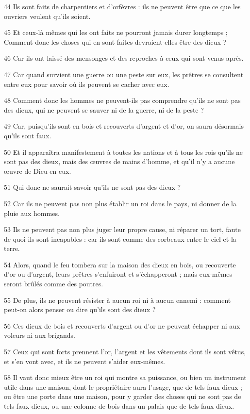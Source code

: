 \par 44 Ils sont faits de charpentiers et d'orfèvres : ils ne peuvent être que ce que les ouvriers veulent qu'ils soient.
\par 45 Et ceux-là mêmes qui les ont faits ne pourront jamais durer longtemps ; Comment donc les choses qui en sont faites devraient-elles être des dieux ?
\par 46 Car ils ont laissé des mensonges et des reproches à ceux qui sont venus après.
\par 47 Car quand survient une guerre ou une peste sur eux, les prêtres se consultent entre eux pour savoir où ils peuvent se cacher avec eux.
\par 48 Comment donc les hommes ne peuvent-ils pas comprendre qu'ils ne sont pas des dieux, qui ne peuvent se sauver ni de la guerre, ni de la peste ?
\par 49 Car, puisqu'ils sont en bois et recouverts d'argent et d'or, on saura désormais qu'ils sont faux.
\par 50 Et il apparaîtra manifestement à toutes les nations et à tous les rois qu'ils ne sont pas des dieux, mais des œuvres de mains d'homme, et qu'il n'y a aucune œuvre de Dieu en eux.
\par 51 Qui donc ne saurait savoir qu'ils ne sont pas des dieux ?
\par 52 Car ils ne peuvent pas non plus établir un roi dans le pays, ni donner de la pluie aux hommes.
\par 53 Ils ne peuvent pas non plus juger leur propre cause, ni réparer un tort, faute de quoi ils sont incapables : car ils sont comme des corbeaux entre le ciel et la terre.
\par 54 Alors, quand le feu tombera sur la maison des dieux en bois, ou recouverte d'or ou d'argent, leurs prêtres s'enfuiront et s'échapperont ; mais eux-mêmes seront brûlés comme des poutres.
\par 55 De plus, ils ne peuvent résister à aucun roi ni à aucun ennemi : comment peut-on alors penser ou dire qu'ils sont des dieux ?
\par 56 Ces dieux de bois et recouverts d'argent ou d'or ne peuvent échapper ni aux voleurs ni aux brigands.
\par 57 Ceux qui sont forts prennent l'or, l'argent et les vêtements dont ils sont vêtus, et s'en vont avec, et ils ne peuvent s'aider eux-mêmes.
\par 58 Il vaut donc mieux être un roi qui montre sa puissance, ou bien un instrument utile dans une maison, dont le propriétaire aura l'usage, que de tels faux dieux ; ou être une porte dans une maison, pour y garder des choses qui ne sont pas de tels faux dieux, ou une colonne de bois dans un palais que de tels faux dieux.
